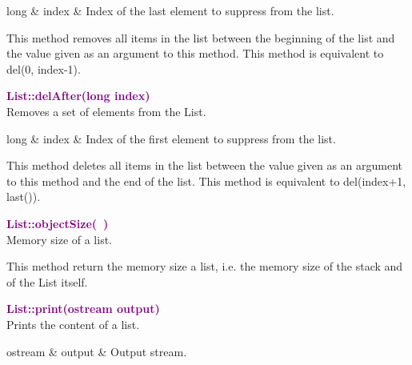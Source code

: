\begin{tcolorbox}[width=\textwidth,myArgs,tabularx={ll|R}]
long & index & Index of the last element to suppress from the list.
\end{tcolorbox}

This method removes all items in the list between the beginning of the list and the value given as an argument to this method.
This method is equivalent to del(0, index-1).

\textcolor{purple}{\textbf{List::delAfter(long index)}}\label{List::delAfter(long index)}\\
Removes a set of elements from the List.

\begin{tcolorbox}[width=\textwidth,myArgs,tabularx={ll|R}]
long & index & Index of the first element to suppress from the list.
\end{tcolorbox}

This method deletes all items in the list between the value given as an argument to this method and the end of the list.
This method is equivalent to del(index+1, last()).

\textcolor{purple}{\textbf{List::objectSize(~)}}\label{List::objectSize()}\\
Memory size of a list.

This method return the memory size a list, i.e. the memory size of the stack and of the List itself.

\textcolor{purple}{\textbf{List::print(ostream output)}}\label{List::print(ostream output)}\\
Prints the content of a list.

\begin{tcolorbox}[width=\textwidth,myArgs,tabularx={ll|R}]
ostream & output & Output stream.
\end{tcolorbox}


